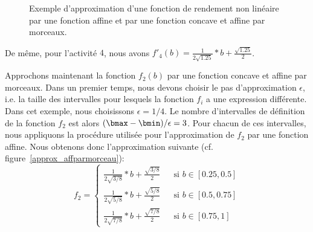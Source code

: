 \begin{ex}
\begin{figure}[!htb]
{}
    \caption{Exemple d'approximation d'une fonction de rendement non
      linéaire par une fonction affine et par une fonction concave et affine par morceaux.}
    \label{approx}
  \end{figure}

  De même, pour l'activité $4$, nous avons
  $f'_4(b)=\frac{1}{2\sqrt{1.25}}*b+ \frac{\sqrt{1.25}}{2}$.

  Approchons maintenant la fonction $f_2(b)$  par une
  fonction concave et affine par morceaux. Dans un premier temps,
  nous devons choisir le pas d'approximation $\epsilon$, i.e. la taille
  des intervalles pour lesquels la fonction $f_i$ a une
  expression différente. Dans cet exemple, nous choisissons
  $\epsilon=1/4$. Le nombre d'intervalles de définition de la fonction
  $f_2$ est alors $(\bmax-\bmin)/\epsilon=3$. Pour chacun de ces
  intervalles, nous appliquons la procédure utilisée pour
  l'approximation de $f_2$ par une fonction affine. Nous obtenons donc
  l'approximation suivante (cf. figure~\ref{approx_affparmorceau}):
  \[f_2=\left\{ 
      \begin{array}{lll}
        \frac{1}{2\sqrt{3/8}}*b + \frac{\sqrt{3/8}}{2}& & \text{si } b \in
                                                          [0.25,0.5]\\
        \frac{1}{2\sqrt{5/8}}*b + \frac{\sqrt{5/8}}{2}& & \text{si } b \in [0.5,0.75]\\
        \frac{1}{2\sqrt{7/8}}*b + \frac{\sqrt{7/8}}{2}& & \text{si } b \in [0.75,1]
      \end{array}
    \right.\]
  
\end{ex}

